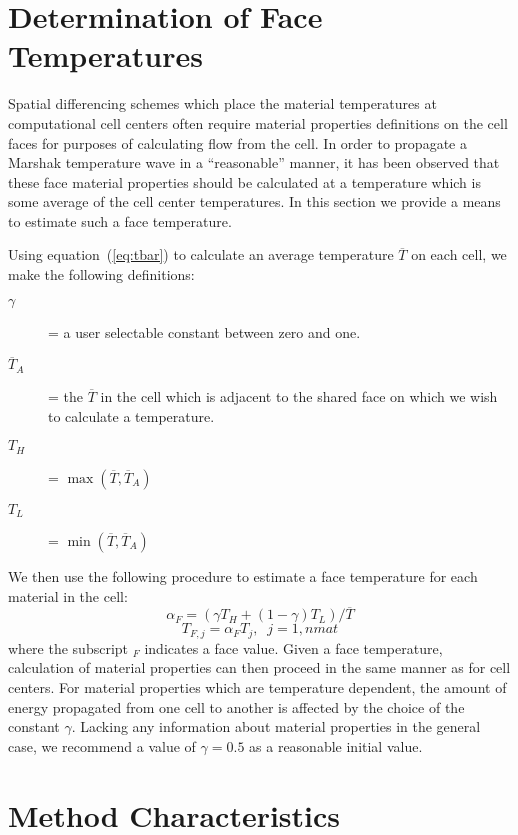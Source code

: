\documentclass[12pt]{article}
\begin{document}
\section{Determination of Face Temperatures}

Spatial differencing schemes which place the material temperatures at
computational cell centers often require material properties definitions
on the cell faces for purposes of calculating flow from the cell. 
In order to propagate a Marshak temperature wave  
in a ``reasonable'' manner, it has been observed
that these face material properties should be calculated at a temperature
which is  some average of the cell center temperatures. In this section
we provide a means to estimate such a face temperature.

Using equation~(\ref{eq:tbar}) to calculate an average temperature
 $\overline{T}$ on each cell, we make the following definitions:
\begin{description}
\item[$\gamma$] = a user selectable constant between zero and one.
\item[$\overline{T}_{A}$] = the $\overline{T}$ in the cell which is adjacent
      to the shared face on which we wish to calculate a temperature.
\item[$T_{H}$] = $\max( \overline{T}, \overline{T}_{A})$
\item[$T_{L}$] = $\min( \overline{T}, \overline{T}_{A})$
\end{description}
We then use the following procedure to estimate a face temperature for
each material in the cell:
\begin{equation}
\alpha_{F} = (\gamma T_{H} + (1 - \gamma) T_{L})/\overline{T}
\end{equation}
\begin{equation}
T_{F,j} = \alpha_{F}T_{j}, \; \; j=1,nmat
\end{equation}
where the subscript $_{F}$ indicates a face value. Given a face
temperature, calculation of material properties can then proceed
in the same manner as for cell centers.
For material properties which are temperature dependent, the amount of
energy propagated from one cell to another is affected by the choice of the
constant $\gamma$. Lacking any information about material properties
in the general case, we recommend a value of $\gamma = 0.5$ as a
reasonable initial value.

\section{Method Characteristics}
\end{document}
